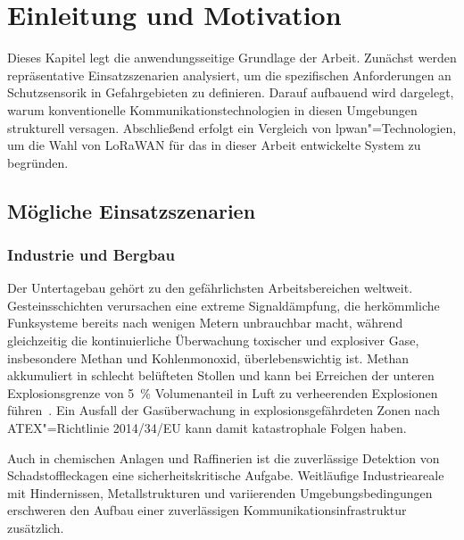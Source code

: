 
\chapter{Einleitung und Motivation}
\label{chap:motivation}

Dieses Kapitel legt die anwendungsseitige Grundlage der Arbeit. Zunächst werden
repräsentative Einsatzszenarien analysiert, um die spezifischen Anforderungen an
Schutzsensorik in Gefahrgebieten zu definieren. Darauf aufbauend wird dargelegt,
warum konventionelle Kommunikationstechnologien in diesen Umgebungen strukturell
versagen. Abschließend erfolgt ein Vergleich von \acrshort{lpwan}"=Technologien, um die
Wahl von LoRaWAN für das in dieser Arbeit entwickelte System zu begründen.


\section{Mögliche Einsatzszenarien}
\label{sec:einsatzszenarien}

\subsection{Industrie und Bergbau}
\label{subsec:uc-industrie}

Der Untertagebau gehört zu den gefährlichsten Arbeitsbereichen weltweit. Gesteinsschichten
verursachen eine extreme Signaldämpfung, die herkömmliche Funksysteme bereits nach
wenigen Metern unbrauchbar macht, während gleichzeitig die kontinuierliche Überwachung
toxischer und explosiver Gase, insbesondere Methan und Kohlenmonoxid,
überlebenswichtig ist. Methan akkumuliert in schlecht belüfteten Stollen
und kann bei Erreichen der unteren Explosionsgrenze von \SI{5}{\percent} Volumenanteil
in Luft zu verheerenden Explosionen führen~\cite{rumbleCRCHandbookChemistry2021}. Ein Ausfall der
Gasüberwachung in explosionsgefährdeten Zonen nach ATEX"=Richtlinie 2014/34/EU
kann damit katastrophale Folgen haben.

Auch in chemischen Anlagen und Raffinerien ist die zuverlässige Detektion von
Schadstoffleckagen eine sicherheitskritische Aufgabe. Weitläufige Industrieareale
mit Hindernissen, Metallstrukturen und variierenden Umgebungsbedingungen
erschweren den Aufbau einer zuverlässigen Kommunikationsinfrastruktur zusätzlich.

